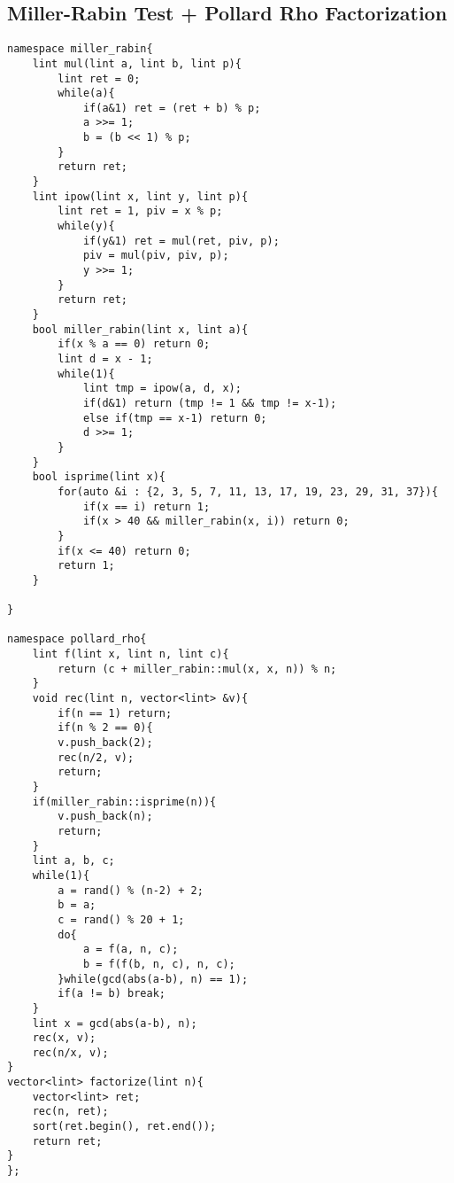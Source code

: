 \documentclass[landscape, 8pt, a4paper, oneside,  twocolumn]{extarticle}
\begin{document}
\subsection{Miller-Rabin Test + Pollard Rho Factorization}
\begin{verbatim}
namespace miller_rabin{
	lint mul(lint a, lint b, lint p){
		lint ret = 0;
		while(a){
			if(a&1) ret = (ret + b) % p;
			a >>= 1;
			b = (b << 1) % p;
		}
		return ret;
	}
	lint ipow(lint x, lint y, lint p){
		lint ret = 1, piv = x % p;
		while(y){
			if(y&1) ret = mul(ret, piv, p);
			piv = mul(piv, piv, p);
			y >>= 1;
		}
		return ret;
	}
	bool miller_rabin(lint x, lint a){
		if(x % a == 0) return 0;
		lint d = x - 1;
		while(1){
			lint tmp = ipow(a, d, x);
			if(d&1) return (tmp != 1 && tmp != x-1);
			else if(tmp == x-1) return 0;
			d >>= 1;
		}
	}
	bool isprime(lint x){
		for(auto &i : {2, 3, 5, 7, 11, 13, 17, 19, 23, 29, 31, 37}){
			if(x == i) return 1;
			if(x > 40 && miller_rabin(x, i)) return 0;
		}
		if(x <= 40) return 0;
		return 1;
	}
	
}

namespace pollard_rho{
	lint f(lint x, lint n, lint c){
		return (c + miller_rabin::mul(x, x, n)) % n;
	}
	void rec(lint n, vector<lint> &v){
		if(n == 1) return;
		if(n % 2 == 0){
		v.push_back(2);
		rec(n/2, v);
		return;
	}
	if(miller_rabin::isprime(n)){
		v.push_back(n);
		return;
	}
	lint a, b, c;
	while(1){
		a = rand() % (n-2) + 2;
		b = a;
		c = rand() % 20 + 1;
		do{
			a = f(a, n, c);
			b = f(f(b, n, c), n, c);
		}while(gcd(abs(a-b), n) == 1);
		if(a != b) break;
	}
	lint x = gcd(abs(a-b), n);
	rec(x, v);
	rec(n/x, v);
}
vector<lint> factorize(lint n){
	vector<lint> ret;
	rec(n, ret);
	sort(ret.begin(), ret.end());
	return ret;
}
};
\end{verbatim}
\end{document}

